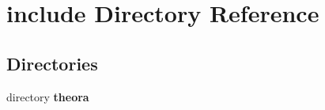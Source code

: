 \section{include Directory Reference}
\label{dir_a1fe1b2cf9055168abcdf67f8f42c5e8}
\subsection*{Directories}
\begin{DoxyCompactItemize}
\item 
directory \textbf{ theora}
\end{DoxyCompactItemize}
